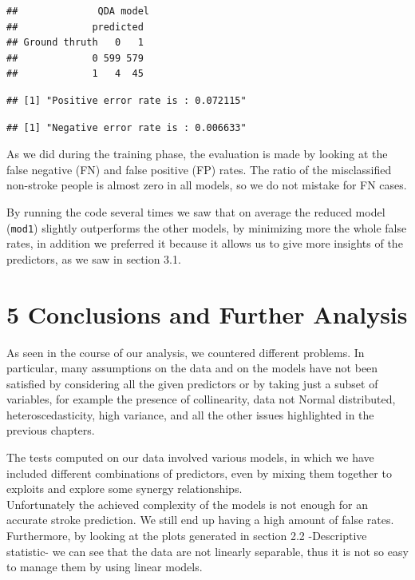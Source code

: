 \documentclass[
]{article}
\begin{document}
\begin{verbatim}
##              QDA model
##             predicted
## Ground thruth   0   1
##             0 599 579
##             1   4  45
\end{verbatim}

\begin{verbatim}
## [1] "Positive error rate is : 0.072115"
\end{verbatim}

\begin{verbatim}
## [1] "Negative error rate is : 0.006633"
\end{verbatim}

As we did during the training phase, the evaluation is made by looking
at the false negative (FN) and false positive (FP) rates. The ratio of
the misclassified non-stroke people is almost zero in all models, so we
do not mistake for FN cases.

By running the code several times we saw that on average the reduced
model (\texttt{mod1}) slightly outperforms the other models, by
minimizing more the whole false rates, in addition we preferred it because it
allows us to give more insights of the predictors, as we saw in section
3.1.

\hypertarget{conclusions-and-further-analysis}{%
\section{5 Conclusions and Further
Analysis}\label{conclusions-and-further-analysis}}

As seen in the course of our analysis, we countered different problems.
In particular, many assumptions on the data and on the models have not
been satisfied by considering all the given predictors or by taking just
a subset of variables, for example the presence of collinearity, data
not Normal distributed, heteroscedasticity, high variance, and all the
other issues highlighted in the previous chapters.

The tests computed on our data involved various models, in which we have
included different combinations of predictors, even by mixing them
together to exploits and explore some synergy relationships.\\
Unfortunately the achieved complexity of the models is not enough for an
accurate stroke prediction. We still end up having a high amount of
false rates.\\
Furthermore, by looking at the plots generated in section 2.2
-Descriptive statistic- we can see that the data are not linearly
separable, thus it is not so easy to manage them by using linear models.
\end{document}
